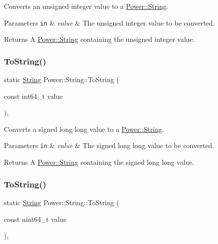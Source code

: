 Converts an unsigned integer value to a \hyperlink{class_power_1_1_string}{Power\+::\+String}. 


\begin{DoxyParams}[1]{Parameters}
\mbox{\tt in}  & {\em value} & The unsigned integer value to be converted. \\
\hline
\end{DoxyParams}
\begin{DoxyReturn}{Returns}
A \hyperlink{class_power_1_1_string}{Power\+::\+String} containing the unsigned integer value. 
\end{DoxyReturn}
\mbox{\label{class_power_1_1_string_a5d8819bfc6a4877b59bd6782c5e75796}} 
\subsubsection{\texorpdfstring{To\+String()}{ToString()}\hspace{0.1cm}{\footnotesize\ttfamily [8/11]}}
{\footnotesize\ttfamily static \hyperlink{class_power_1_1_string}{String} Power\+::\+String\+::\+To\+String (\begin{DoxyParamCaption}\item[{const int64\+\_\+t}]{value }\end{DoxyParamCaption})\hspace{0.3cm}{\ttfamily [inline]}, {\ttfamily [static]}}



Converts a signed long long value to a \hyperlink{class_power_1_1_string}{Power\+::\+String}. 


\begin{DoxyParams}[1]{Parameters}
\mbox{\tt in}  & {\em value} & The signed long long value to be converted. \\
\hline
\end{DoxyParams}
\begin{DoxyReturn}{Returns}
A \hyperlink{class_power_1_1_string}{Power\+::\+String} containing the signed long long value. 
\end{DoxyReturn}
\mbox{\label{class_power_1_1_string_a986108efc696a9791ae48e7b6d71557c}} 
\subsubsection{\texorpdfstring{To\+String()}{ToString()}\hspace{0.1cm}{\footnotesize\ttfamily [9/11]}}
{\footnotesize\ttfamily static \hyperlink{class_power_1_1_string}{String} Power\+::\+String\+::\+To\+String (\begin{DoxyParamCaption}\item[{const uint64\+\_\+t}]{value }\end{DoxyParamCaption})\hspace{0.3cm}{\ttfamily [inline]}, {\ttfamily [static]}}



